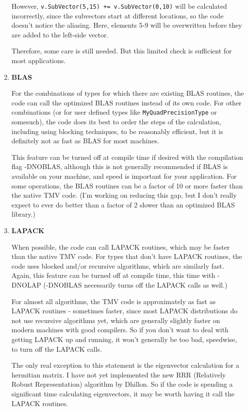 \documentclass[twoside,letterpaper,11pt]{article}
\renewcommand{\tt}[1]{{\texttt {#1}}}
\begin{document}
\begin{enumerate}
However, \tt{v.SubVector(5,15) += v.SubVector(0,10)} will be calculated 
incorrectly, since the subvectors start at different locations, so the code
doesn't notice the aliasing.  Here, elements 5-9 will be overwritten before
they are added to the left-side vector.

Therefore, some care is still needed.  But this limited check is sufficient
for most applications.

\item
\textbf{BLAS}

For the combinations of types for which there are existing BLAS
routines, the code can call the optimized BLAS routines instead of its own 
code.  For other combinations (or for user defined types like 
\tt{MyQuadPrecisionType} or somesuch), 
the code does its best to order the steps of the calculation, including
using blocking techniques, to be 
reasonably efficient, but it is definitely not as fast as BLAS for
most machines.

This feature can be turned off at compile time if desired with the 
compilation flag -DNOBLAS, although this is not generally recommended if 
BLAS is available on your machine, and speed is important for your 
application.  For some operations, the BLAS routines can be a factor of 
10 or more faster than the native TMV code.  (I'm working on reducing this
gap, but I don't really expect to ever do better than a factor of 2 slower
than an optimized BLAS library.)

\item
\textbf{LAPACK}

When possible, the code can call LAPACK routines, which
may be faster than the native TMV code.  For types that don't have LAPACK routines, 
the code uses blocked and/or recursive algorithms, which are similarly fast.  
Again, this feature can be turned off at compile time, this time with -DNOLAP
(-DNOBLAS necessarily turns off the LAPACK calls as well.)

For almost all algorithms, 
the TMV code is approximately as fast as LAPACK routines -
sometimes faster, since most
LAPACK distributions do not use recursive algorithms yet, which are generally
slightly faster on modern machines with good compilers. 
So if you don't want to deal with getting LAPACK
up and running, it won't generally be too bad, speedwise, 
to turn off the LAPACK calls.

The only real exception to this statement
is the eigenvector calculation for a hermitian matrix.  I have not yet 
implemented the new RRR
(Relatively Robust Representation) algorithm by Dhillon.  So if the code is
spending a significant time calculating eigenvectors, it may be worth having it call the
LAPACK routines.


\end{enumerate}
\end{document}
